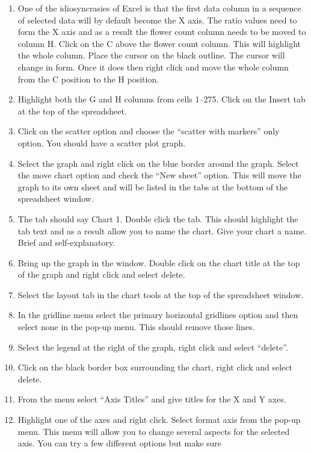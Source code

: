 \documentclass[12pt, hidelinks]{exam}
\begin{document}
\begin{enumerate}
\item
  One of the idiosyncrasies of Excel is that the first data column in a
  sequence of selected data will by default become the X axis. The ratio
  values need to form the X axis and as a result the flower count column
  needs to be moved to column H. Click on the C above the flower count
  column. This will highlight the whole column. Place the cursor on the
  black outline. The cursor will change in form. Once it does then right
  click and move the whole column from the C position to the H position.
\item
  Highlight both the G and H columns from cells 1–275. Click on the
  Insert tab at the top of the spreadsheet.
\item
  Click on the scatter option and choose the ``scatter with markers''
  only option. You should have a scatter plot graph.
\item
  Select the graph and right click on the blue border around the graph.
  Select the move chart option and check the ``New sheet'' option. This
  will move the graph to its own sheet and will be listed in the tabs at
  the bottom of the spreadsheet window.
\item
  The tab should say Chart 1. Double click the tab. This should
  highlight the tab text and as a result allow you to name the chart.
  Give your chart a name. Brief and self-explanatory.
\item
  Bring up the graph in the window. Double click on the chart title at
  the top of the graph and right click and select delete.
\item
  Select the layout tab in the chart tools at the top of the spreadsheet
  window.
\item
  In the gridline menu select the primary horizontal gridlines option
  and then select none in the pop-up menu. This should remove those
  lines.
\item
  Select the legend at the right of the graph, right click and select
  ``delete''.
\item
  Click on the black border box surrounding the chart, right click and
  select delete.
\item
  From the menu select ``Axis Titles'' and give titles for the X and Y
  axes.
\item
  Highlight one of the axes and right click. Select format axis from the
  pop-up menu. This menu will allow you to change several aspects for
  the selected axis. You can try a few different options but make sure

\end{enumerate}
\end{document}
